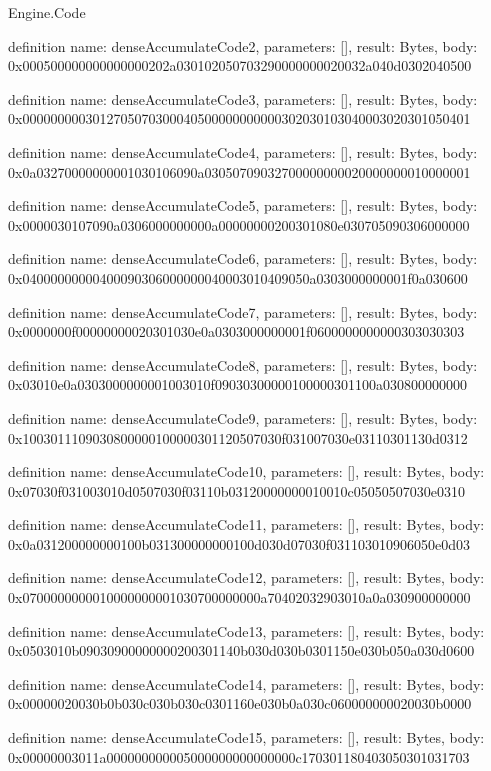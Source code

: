 \begin{lexlean}{Engine.Code}
\begin{semanticmodule}
definition{
  name: denseAccumulateCode2,
  parameters: [],
  result: Bytes,
  body: 0x000500000000000000202a030102050703290000000020032a040d0302040500
}

definition{
  name: denseAccumulateCode3,
  parameters: [],
  result: Bytes,
  body: 0x0000000003012705070300040500000000000302030103040003020301050401
}

definition{
  name: denseAccumulateCode4,
  parameters: [],
  result: Bytes,
  body: 0x0a03270000000001030106090a03050709032700000000020000000010000001
}

definition{
  name: denseAccumulateCode5,
  parameters: [],
  result: Bytes,
  body: 0x0000030107090a0306000000000a00000000200301080e030705090306000000
}

definition{
  name: denseAccumulateCode6,
  parameters: [],
  result: Bytes,
  body: 0x04000000000400090306000000040003010409050a0303000000001f0a030600
}

definition{
  name: denseAccumulateCode7,
  parameters: [],
  result: Bytes,
  body: 0x0000000f00000000020301030e0a0303000000001f0600000000000303030303
}

definition{
  name: denseAccumulateCode8,
  parameters: [],
  result: Bytes,
  body: 0x03010e0a0303000000001003010f09030300000100000301100a030800000000
}

definition{
  name: denseAccumulateCode9,
  parameters: [],
  result: Bytes,
  body: 0x1003011109030800000100000301120507030f031007030e03110301130d0312
}

definition{
  name: denseAccumulateCode10,
  parameters: [],
  result: Bytes,
  body: 0x07030f031003010d0507030f03110b03120000000010010c05050507030e0310
}

definition{
  name: denseAccumulateCode11,
  parameters: [],
  result: Bytes,
  body: 0x0a031200000000100b031300000000100d030d07030f031103010906050e0d03
}

definition{
  name: denseAccumulateCode12,
  parameters: [],
  result: Bytes,
  body: 0x0700000000010000000001030700000000a70402032903010a0a030900000000
}

definition{
  name: denseAccumulateCode13,
  parameters: [],
  result: Bytes,
  body: 0x0503010b09030900000000200301140b030d030b0301150e030b050a030d0600
}

definition{
  name: denseAccumulateCode14,
  parameters: [],
  result: Bytes,
  body: 0x00000020030b0b030c030b030c0301160e030b0a030c060000000020030b0000
}

definition{
  name: denseAccumulateCode15,
  parameters: [],
  result: Bytes,
  body: 0x00000003011a000000000005000000000000000c170301180403050301031703
}


\end{semanticmodule}
\end{lexlean}
